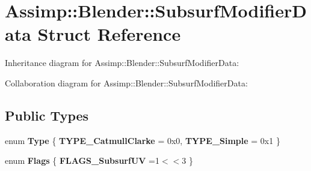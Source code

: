 \hypertarget{struct_assimp_1_1_blender_1_1_subsurf_modifier_data}{\section{Assimp\+:\+:Blender\+:\+:Subsurf\+Modifier\+Data Struct Reference}
\label{struct_assimp_1_1_blender_1_1_subsurf_modifier_data}
}


Inheritance diagram for Assimp\+:\+:Blender\+:\+:Subsurf\+Modifier\+Data\+:


Collaboration diagram for Assimp\+:\+:Blender\+:\+:Subsurf\+Modifier\+Data\+:
\subsection*{Public Types}
\begin{DoxyCompactItemize}
\item 
\hypertarget{struct_assimp_1_1_blender_1_1_subsurf_modifier_data_a611a5ba00a138d7b98dbcd733dd2e8af}{enum {\bfseries Type} \{ {\bfseries T\+Y\+P\+E\+\_\+\+Catmull\+Clarke} = 0x0, 
{\bfseries T\+Y\+P\+E\+\_\+\+Simple} = 0x1
 \}}\label{struct_assimp_1_1_blender_1_1_subsurf_modifier_data_a611a5ba00a138d7b98dbcd733dd2e8af}

\item 
\hypertarget{struct_assimp_1_1_blender_1_1_subsurf_modifier_data_a75d972d363c321ea52f933fbad612cca}{enum {\bfseries Flags} \{ {\bfseries F\+L\+A\+G\+S\+\_\+\+Subsurf\+U\+V} =1$<$$<$3
 \}}\label{struct_assimp_1_1_blender_1_1_subsurf_modifier_data_a75d972d363c321ea52f933fbad612cca}

\end{DoxyCompactItemize}
